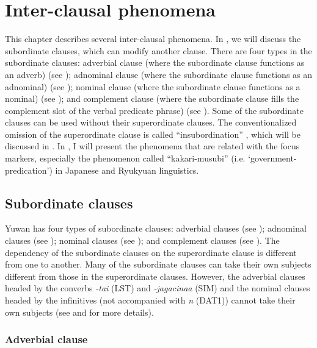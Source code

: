 \chapter{Inter-clausal phenomena}\label{chap:11}

This chapter describes several inter-clausal phenomena. In , we will discuss the subordinate clauses, which can modify another clause. There are four types in the subordinate clauses: adverbial clause (where the subordinate clause functions as an adverb) (see ); adnominal clause (where the subordinate clause functions as an adnominal) (see ); nominal clause (where the subordinate clause functions as a nominal) (see ); and complement clause (where the subordinate clause fills the complement slot of the verbal predicate phrase) (see ). Some of the subordinate clauses can be used without their superordinate clauses. The conventionalized omission of the superordinate clause is called “insubordination” \citep{Evans2007}, which will be discussed in . In , I will present the phenomena that are related with the focus markers, especially the phenomenon called “kakari-musubi” (i.e. ‘government-predication’) in Japanese and Ryukyuan linguistics.

\section{Subordinate clauses}\label{sec:11:1}

Yuwan has four types of subordinate clauses: adverbial clauses (see ); adnominal clauses (see ); nominal clauses (see ); and complement clauses (see ). The dependency of the subordinate clauses on the superordinate clause is different from one to another. Many of the subordinate clauses can take their own subjects different from those in the superordinate clauses. However, the adverbial clauses headed by the converbs \textit{{}-tai} (LST) and \textit{{}-jagacinaa} (SIM) and the nominal clauses headed by the infinitives (not accompanied with \textit{n} (DAT1)) cannot take their own subjects (see  and  for more details).

\subsection{Adverbial clause}\label{sec:11:1.1}

